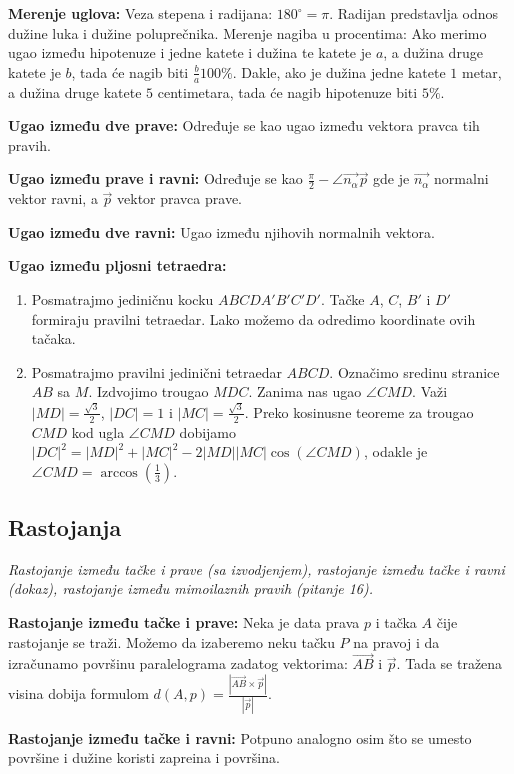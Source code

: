 \documentclass[12pt]{article}
\newcommand{\vek}[1]{\overrightarrow{#1}}
\begin{document}
\textbf{Merenje uglova:} Veza stepena i radijana: $180^\circ=\pi$. Radijan
predstavlja odnos dužine luka i dužine poluprečnika. Merenje nagiba u
procentima: Ako merimo ugao između hipotenuze i jedne katete i dužina te katete
je $a$, a dužina druge katete je $b$, tada će nagib biti $\frac{b}{a}100\%$.
Dakle, ako je dužina jedne katete $1$ metar, a dužina druge katete $5$
centimetara, tada će nagib hipotenuze biti $5\%$.
\par

\textbf{Ugao između dve prave:} Određuje se kao ugao između vektora pravca tih
pravih.
\par

\textbf{Ugao između prave i ravni:} Određuje se kao
$\frac{\pi}{2}-\angle{\vek{n_\alpha}\vek{p}}$ gde je $\vek{n_\alpha}$ normalni
vektor ravni, a $\vek{p}$ vektor pravca prave.
\par

\textbf{Ugao između dve ravni:} Ugao između njihovih normalnih vektora.
\par

\textbf{Ugao između pljosni tetraedra:}
\begin{enumerate}[label=\textbf{(\arabic*)}]
    \item Posmatrajmo jediničnu kocku $ABCDA'B'C'D'$. Tačke $A$, $C$, $B'$ i
          $D'$ formiraju pravilni tetraedar. Lako možemo da odredimo
          koordinate ovih tačaka.
    \item Posmatrajmo pravilni jedinični tetraedar $ABCD$. Označimo sredinu
          stranice $AB$ sa $M$. Izdvojimo trougao $MDC$. Zanima nas ugao
          $\angle CMD$. Važi $|MD|=\frac{\sqrt{3}}{2}$, $|DC|=1$ i
          $|MC|=\frac{\sqrt{3}}{2}$. Preko kosinusne teoreme za trougao $CMD$
          kod ugla $\angle CMD$ dobijamo
          $|DC|^2=|MD|^2+|MC|^2-2|MD||MC|\cos(\angle CMD)$, odakle je
          $\angle CMD=\arccos(\frac{1}{3})$.
\end{enumerate}

\subsection{Rastojanja}
\textit{Rastojanje između tačke i prave (sa izvodjenjem), rastojanje između
    tačke i ravni (dokaz), rastojanje između mimoilaznih pravih (pitanje 16).}
\par
\vspace*{1cm}

\textbf{Rastojanje između tačke i prave:} Neka je data prava $p$ i tačka $A$
čije rastojanje se traži. Možemo da izaberemo neku tačku $P$ na pravoj i da
izračunamo površinu paralelograma zadatog vektorima: $\vek{AB}$ i $\vek{p}$.
Tada se tražena visina dobija formulom
$d(A,p)=\frac{|\vek{AB}\times\vek{p}|}{|\vek{p}|}$.
\par
\textbf{Rastojanje između tačke i ravni:} Potpuno analogno osim što se umesto
površine i dužine koristi zapreina i površina.
\par
\end{document}
